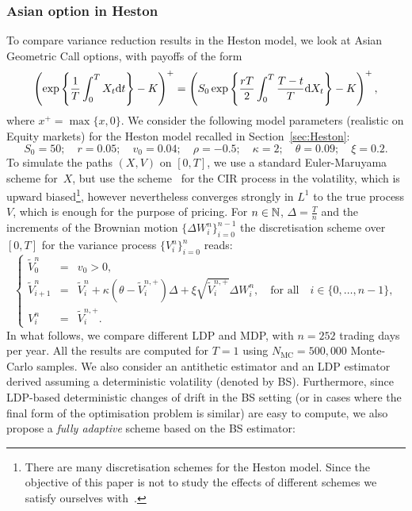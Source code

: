 \subsubsection{Asian option in Heston}
To compare variance reduction results in the Heston model, we look at Asian Geometric Call options, with payoffs of the form
\[
\left(\exp\left\{\frac{1}{T}\int_0^T X_t\mathrm{d} t\right\} - K\right)^+ = \left(S_0 \exp\left \{\frac{rT}{2}\int_0^T\frac{T-t}{T}\mathrm{d} X_t\right \} - K\right)^+,
\]
where $x^+ = \max\{x,0\}$. 
We consider the following model parameters 
(realistic on Equity markets)
for the Heston model recalled in Section~\ref{sec:Heston}:
$$
S_0 = 50; \quad
r = 0.05; \quad
v_0 = 0.04; \quad
\rho = -0.5; \quad 
\kappa = 2; \quad
\theta = 0.09; \quad 
\xi = 0.2.
$$
To simulate the paths $(X,V)$ on $[0,T]$, 
we use a standard Euler-Maruyama scheme for~$X$, but use the scheme~\cite{Lord2009AModels} for the CIR process in the volatility, 
which is upward biased\footnote{There are many discretisation schemes for the Heston model. 
Since the objective of this paper is not to study the effects of different schemes we satisfy ourselves with~\cite{Lord2009AModels}.}, however nevertheless converges strongly in $L^1$ to the true process $V$, which is enough for the purpose of pricing. For $n\in\mathbb{N}$, $\Delta =\frac{T}{n}$ and the increments of the Brownian motion $\{\Delta W_{i}^n\}_{i=0}^{n-1}$ the discretisation scheme over $[0,T]$ for the variance process $\{V_i^n\}_{i=0}^n$ reads:
\begin{equation*}
\left\{
\begin{array}{rcl}
\widetilde{V}_{0}^n & = & v_0>0,\\
\widetilde{V}_{i+1}^n & = & \widetilde{V}_{i}^n + \kappa \left(\theta - \widetilde{V}_{i}^{n,+}\right)\Delta + \xi \sqrt{\widetilde{V}_{i}^{n,+}}\Delta W_{i}^n, \quad \text{for all} \quad i\in\{0,\dots,n-1\},\\
V_{i}^n & = & \widetilde{V}_{i}^{n,+}.
\end{array}
\right.
\end{equation*}
In what follows, we compare different LDP and MDP, with $n=252$ trading days per year. 
All the results are computed for $T=1$ using $N_{\text{MC}}=500,000$ Monte-Carlo samples. 
We also consider an antithetic estimator and an LDP estimator derived assuming a deterministic volatility (denoted by BS).
Furthermore, since LDP-based deterministic changes of drift in the BS setting (or in cases where the final form of the optimisation problem is similar) are easy to compute, we also propose a \textit{fully adaptive} scheme based on the BS estimator: 
